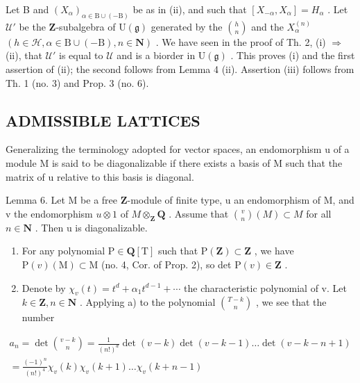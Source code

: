 Let B and \((X_{\alpha})_{\alpha\in\mathrm{B}\cup(-\mathrm{B})}\) be as in (ii), and such that \([X_{-\alpha},X_{\alpha}]=H_{\alpha}\) . Let \(\mathcal{U}'\) be the \(\mathbf{Z}\)-subalgebra of \(\mathrm{U}(\mathfrak{g})\) generated by the \(\binom{h}{n}\) and the \(X_{\alpha}^{(n)}\) \((h\in\mathcal{H},\alpha\in\mathrm{B}\cup(-\mathrm{B}),n\in\mathbf{N})\) . We have seen in the proof of Th. 2, (i) \(\Longrightarrow\) (ii), that \(\mathcal{U}'\) is equal to \(\mathcal{U}\) and is a biorder in \(\mathrm{U}(\mathfrak{g})\) . This proves (i) and the first assertion of (ii); the second follows from Lemma 4 (ii). Assertion (iii) follows from Th. 1 (no. 3) and Prop. 3 (no. 6).

\subsection{ADMISSIBLE LATTICES}

Generalizing the terminology adopted for vector spaces, an endomorphism u of a module M is said to be diagonalizable if there exists a basis of M such that the matrix of u relative to this basis is diagonal.

Lemma 6. Let M be a free \(\mathbf{Z}\)-module of finite type, u an endomorphism of M, and v the endomorphism \(u \otimes 1\) of \(M \otimes_{\mathbf{Z}} \mathbf{Q}\) . Assume that \(\binom{v}{n}(M) \subset M\) for all \(n \in \mathbf{N}\) . Then u is diagonalizable.

\begin{enumerate}
\def\labelenumi{\alph{enumi})}
\item
  For any polynomial \(\mathrm{P} \in \mathbf{Q}[\mathrm{T}]\) such that \(\mathrm{P}(\mathbf{Z}) \subset \mathbf{Z}\) , we have \(\mathrm{P}(v)(\mathrm{M}) \subset \mathrm{M}\) (no. 4, Cor. of Prop. 2), so det \(\mathrm{P}(v) \in \mathbf{Z}\) .
\item
  Denote by \(\chi_{v}(t)=t^{d}+\alpha_{1}t^{d-1}+\cdots\) the characteristic polynomial of v. Let \(k\in\mathbf{Z}, n\in\mathbf{N}\) . Applying a) to the polynomial \(\binom{T-k}{n}\) , we see that the number
\end{enumerate}

\[
\begin{array}{l} a _ {n} = \det \binom {v - k} {n} = \frac {1}{(n !) ^ {d}} \det (v - k) \det (v - k - 1) \dots \det (v - k - n + 1) \\ = \frac {(- 1) ^ {n}}{(n !) ^ {4}} \chi_ {v} (k) \chi_ {v} (k + 1) \dots \chi_ {v} (k + n - 1) \end{array}
\]


